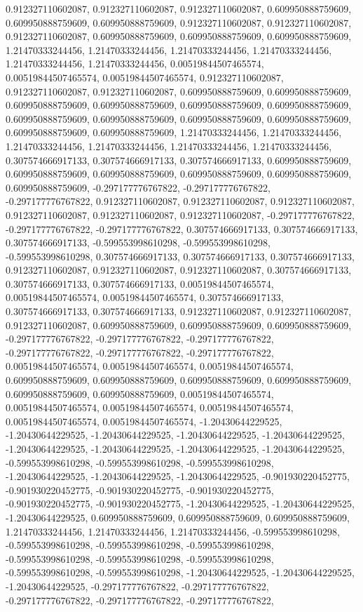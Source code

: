 \documentclass[
  ,man]{apa6}
\begin{document}
0.912327110602087, 0.912327110602087, 0.912327110602087, 0.609950888759609, 0.609950888759609, 0.609950888759609, 0.912327110602087, 0.912327110602087, 0.912327110602087, 0.609950888759609, 0.609950888759609, 0.609950888759609, 1.21470333244456, 1.21470333244456, 1.21470333244456, 1.21470333244456, 1.21470333244456, 1.21470333244456, 0.00519844507465574, 0.00519844507465574, 0.00519844507465574, 0.912327110602087, 0.912327110602087, 0.912327110602087, 0.609950888759609, 0.609950888759609, 0.609950888759609,
0.609950888759609, 0.609950888759609, 0.609950888759609, 0.609950888759609, 0.609950888759609, 0.609950888759609, 0.609950888759609, 0.609950888759609, 0.609950888759609, 1.21470333244456, 1.21470333244456, 1.21470333244456, 1.21470333244456, 1.21470333244456, 1.21470333244456, 0.307574666917133, 0.307574666917133, 0.307574666917133, 0.609950888759609, 0.609950888759609, 0.609950888759609, 0.609950888759609, 0.609950888759609, 0.609950888759609, -0.297177776767822, -0.297177776767822, -0.297177776767822,
0.912327110602087, 0.912327110602087, 0.912327110602087, 0.912327110602087, 0.912327110602087, 0.912327110602087, -0.297177776767822, -0.297177776767822, -0.297177776767822, 0.307574666917133, 0.307574666917133, 0.307574666917133, -0.599553998610298, -0.599553998610298, -0.599553998610298, 0.307574666917133, 0.307574666917133, 0.307574666917133, 0.912327110602087, 0.912327110602087, 0.912327110602087, 0.307574666917133, 0.307574666917133, 0.307574666917133, 0.00519844507465574, 0.00519844507465574,
0.00519844507465574, 0.307574666917133, 0.307574666917133, 0.307574666917133, 0.912327110602087, 0.912327110602087, 0.912327110602087, 0.609950888759609, 0.609950888759609, 0.609950888759609, -0.297177776767822, -0.297177776767822, -0.297177776767822, -0.297177776767822, -0.297177776767822, -0.297177776767822, 0.00519844507465574, 0.00519844507465574, 0.00519844507465574, 0.609950888759609, 0.609950888759609, 0.609950888759609, 0.609950888759609, 0.609950888759609, 0.609950888759609, 0.00519844507465574,
0.00519844507465574, 0.00519844507465574, 0.00519844507465574, 0.00519844507465574, 0.00519844507465574, -1.20430644229525, -1.20430644229525, -1.20430644229525, -1.20430644229525, -1.20430644229525, -1.20430644229525, -1.20430644229525, -1.20430644229525, -1.20430644229525, -0.599553998610298, -0.599553998610298, -0.599553998610298, -1.20430644229525, -1.20430644229525, -1.20430644229525, -0.901930220452775, -0.901930220452775, -0.901930220452775, -0.901930220452775, -0.901930220452775, -0.901930220452775,
-1.20430644229525, -1.20430644229525, -1.20430644229525, 0.609950888759609, 0.609950888759609, 0.609950888759609, 1.21470333244456, 1.21470333244456, 1.21470333244456, -0.599553998610298, -0.599553998610298, -0.599553998610298, -0.599553998610298, -0.599553998610298, -0.599553998610298, -0.599553998610298, -0.599553998610298, -0.599553998610298, -1.20430644229525, -1.20430644229525, -1.20430644229525, -0.297177776767822, -0.297177776767822, -0.297177776767822, -0.297177776767822, -0.297177776767822,
\end{document}
